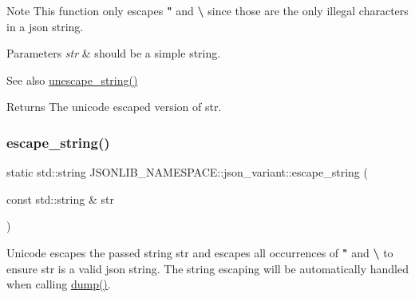 \begin{DoxyNote}{Note}
This function only escapes {\bfseries "} and {\bfseries \textbackslash{}} since those are the only illegal characters in a json string. 
\end{DoxyNote}

\begin{DoxyParams}{Parameters}
{\em str} & should be a simple string. \\
\hline
\end{DoxyParams}
\begin{DoxySeeAlso}{See also}
\hyperlink{classJSONLIB__NAMESPACE_1_1json__variant_ab3b411443074a97949b5675676d0b136}{unescape\+\_\+string()} 
\end{DoxySeeAlso}
\begin{DoxyReturn}{Returns}
The unicode escaped version of {\ttfamily str}. 
\end{DoxyReturn}
\mbox{\label{classJSONLIB__NAMESPACE_1_1json__variant_a12b4d75511a0e52da1f1e726755fe618}} 
\subsubsection{\texorpdfstring{escape\+\_\+string()}{escape\_string()}\hspace{0.1cm}{\footnotesize\ttfamily [2/2]}}
{\footnotesize\ttfamily static std\+::string J\+S\+O\+N\+L\+I\+B\+\_\+\+N\+A\+M\+E\+S\+P\+A\+C\+E\+::json\+\_\+variant\+::escape\+\_\+string (\begin{DoxyParamCaption}\item[{const std\+::string \&}]{str }\end{DoxyParamCaption})\hspace{0.3cm}{\ttfamily [static]}}



Unicode escapes the passed string {\ttfamily str} and escapes all occurrences of {\bfseries "} and {\bfseries \textbackslash{}} to ensure {\ttfamily str} is a valid json string. The string escaping will be automatically handled when calling \hyperlink{classJSONLIB__NAMESPACE_1_1json__variant_a72d4a39d77b76f076354219edc6ea4a0}{dump()}. 

